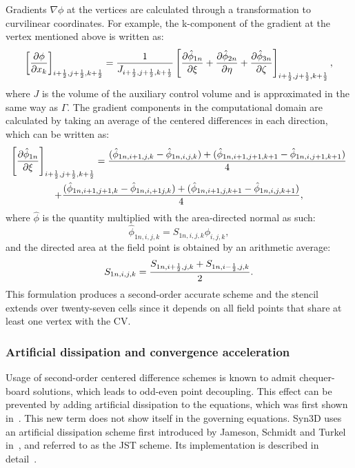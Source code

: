 Gradients $\nabla \phi$ at the vertices are calculated through a transformation to curvilinear coordinates. For example, the k-component of the gradient at the vertex mentioned above is written as:
\begin{equation}
    \left[ \pdiff{\phi}{x_k} \right]_{i+\half,j+\half,k+\half} = 
        \frac{1}{J_{i+\half,j+\half,k+\half}}
        \left[
            \pdiff{\hat{\phi}_{1n}}{\xi} + \pdiff{\hat{\phi}_{2n}}{\eta} + \pdiff{\hat{\phi}_{3n}}{\zeta}
        \right]_{i+\half,j+\half,k+\half}
    \label{eq:velgradvertex},
\end{equation}
where $J$ is the volume of the auxiliary control volume and is approximated in the same way as $\Gamma$. The gradient components in the computational domain are calculated by taking an average of the centered differences in each direction, which can be written as:
\begin{gather*}
    \left[ 
        \pdiff{\hat{\phi}_{1n}}{\xi} 
    \right]_{i+\half,j+\half,k+\half}
    = \frac{
        (\hat{\phi}_{1n,i+1,j,k} - \hat{\phi}_{1n,i,j,k})
      + (\hat{\phi}_{1n,i+1,j+1,k+1} - \hat{\phi}_{1n,i,j+1,k+1})
    }{4}\\
    + \frac{
        (\hat{\phi}_{1n,i+1,j+1,k} - \hat{\phi}_{1n,i,+1j,k})
      + (\hat{\phi}_{1n,i+1,j,k+1} - \hat{\phi}_{1n,i,j,k+1})
    }{4},
\end{gather*}
where $\hat{\phi}$ is the quantity multiplied with the area-directed normal as such:
\begin{equation*}
    \hat{\phi}_{1n,i,j,k} = S_{1n,i,j,k}\phi_{i,j,k},
\end{equation*}
and the directed area at the field point is obtained by an arithmetic average:
\begin{equation*}
    S_{1n,i,j,k} = \frac{S_{1n,i+\frac{1}{2},j,k} + S_{1n,i-\frac{1}{2},j,k}}{2}.
\end{equation*}
This formulation produces a second-order accurate scheme and the stencil extends over twenty-seven cells since it depends on all field points that share at least one vertex with the CV.
%
\subsubsection{Artificial dissipation and convergence acceleration}
Usage of second-order centered difference schemes is known to admit chequer-board solutions, which leads to odd-even point decoupling. This effect can be prevented by adding artificial dissipation to the equations, which was first shown in~\cite{vonneumann1950method}. This new term does not show itself in the governing equations. Syn3D uses an artificial dissipation scheme first introduced by Jameson, Schmidt and Turkel in~\cite{jameson1981numerical}, and referred to as the JST scheme. Its implementation is described in detail~\cite{nadarajah2003discrete}.

